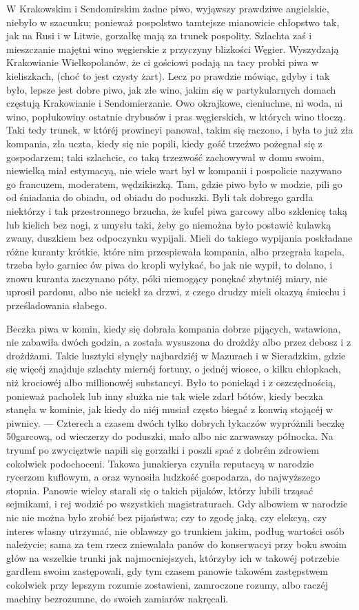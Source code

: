\documentclass{book}
\begin{document}
W Krakowskim i Sendomirskim żadne piwo, wyjąwszy prawdziwe angielskie, niebyło w szacunku; ponieważ pospolstwo tamtejsze mianowicie chłopstwo tak, jak na Rusi i w Litwie, gorzałkę mają za trunek pospolity. Szlachta zaś i mieszczanie majętni wino węgierskie z przyczyny blizkości Węgier. Wyszydzają Krakowianie Wielkopolanów, że ci gościowi podają na tacy probki piwa w kieliszkach, (choć to jest czysty żart). Lecz po prawdzie mówiąc, gdyby i tak było, lepsze jest dobre piwo, jak złe wino, jakim się w partykularnych domach częstują Krakowianie i Sendomierzanie. Owo okrajkowe, cieniuchne, ni woda, ni wino, popłukowiny ostatnie drybusów i pras węgierskich, w których wino tłoczą. Taki tedy trunek, w któréj prowincyi panował, takim się raczono, i była to już zła kompania, zła uczta, kiedy się nie popili, kiedy gość trzeźwo pożegnał się z gospodarzem; taki szlachcic, co taką trzezwość zachowywał w domu swoim, niewielką miał estymacyą, nie wiele wart był w kompanii i pospolicie nazywano go francuzem, moderatem, wędzikiszką. Tam, gdzie piwo było w modzie, pili go od śniadania do obiadu, od obiadu do poduszki. Byli tak dobrego gardła niektórzy i tak przestronnego brzucha, że kufel piwa garcowy albo szklenicę taką lub kielich bez nogi, z umysłu taki, żeby go niemożna było postawić kulawką zwany, duszkiem bez odpoczynku wypijali. Mieli do takiego wypijania poskładane różne kuranty krótkie, które nim przespiewała kompania, albo przegrała kapela, trzeba było garniec ów piwa do kropli wyłykać, bo jak nie wypił, to dolano, i znowu kuranta zaczynano póty, póki niemogący ponękać zbytniéj miary, nie uprosił pardonu, albo nie uciekł za drzwi, z czego drudzy mieli okazyą śmiechu i prześladowania słabego.

Beczka piwa w komin, kiedy się dobrała kompania dobrze pijących, wstawiona, nie zabawiła dwóch godzin, a została wysuszona do drożdży albo przez debosz i z drożdżami. Takie lusztyki słynęły najbardziéj w Mazurach i w Sieradzkim, gdzie się więcéj znajduje szlachty miernéj fortuny, o jednéj wiosce, o kilku chłopkach, niż krociowéj albo millionowéj substancyi. Było to poniekąd i z oszczędnością, ponieważ pachołek lub inny służka nie tak wiele zdarł bótów, kiedy beczka stanęła w kominie, jak kiedy do niéj musiał często biegać z konwią stojącéj w piwnicy. — Czterech a czasem dwóch tylko dobrych łykaczów wypróżnili beczkę 50garcową, od wieczerzy do poduszki, mało albo nic zarwawszy północka. Na tryumf po zwycięztwie napili się gorzałki i poszli spać z dobrém zdrowiem cokolwiek podochoceni. Takowa junakierya czyniła reputacyą w narodzie rycerzom kuflowym, a oraz wynosiła ludzkość gospodarza, do najwyższego stopnia. Panowie wielcy starali się o takich pijaków, którzy lubili trząsać sejmikami, i rej wodzić po wszystkich magistraturach. Gdy albowiem w narodzie nic nie można było zrobić bez pijaństwa; czy to zgodę jaką, czy elekcyą, czy interes własny utrzymać, nie oblawszy go trunkiem jakim, podług wartości osób należycie; sama za tem rzecz zniewalała panów do konserwacyi przy boku swoim głów na wszelkie trunki jak najmocniejszych, którzyby ich w takowéj potrzebie gardłem swoim zastępowali, gdy tym czasem panowie takowém zastępstwem cokolwiek przy lepszym rozumie zostawieni, zamroczone rozumy, albo raczéj machiny bezrozumne, do swoich zamiarów nakręcali.
\end{document}
